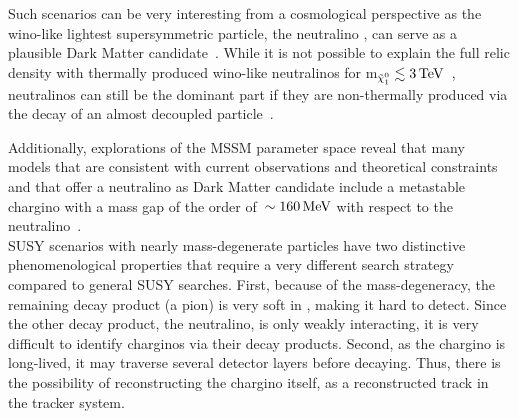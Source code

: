 Such scenarios can be very interesting from a cosmological perspective as the wino-like lightest supersymmetric particle, the neutralino \chiO, can serve as a plausible Dark Matter candidate~\cite{bib:Ibe:DarkMatter_2015,bib:Hisano:DarkMatter_2005}.
While it is not possible to explain the full relic density with thermally produced wino-like neutralinos for m$_{\tilde{\chi}^{0}_{1}}\lesssim 3\,\text{Te}\kern-0.06667em\text{V}$~\cite{bib:IndirectSearches_Cohen_2013}, neutralinos can still be the dominant part if they are non-thermally produced via the decay of an almost decoupled particle~\cite{bib:Moroi:DarkMatter_1999,bib:Moroi:DarkMatter_2013}.

Additionally, explorations of the MSSM parameter space reveal that many models that are consistent with current observations and theoretical constraints and that offer a neutralino as Dark Matter candidate include a metastable chargino with a mass gap of the order of~$\sim160\,\text{Me}\kern-0.06667em\text{V}$ with respect to the neutralino~\cite{bib:pMSSMScan_2013}.\\

SUSY scenarios with nearly mass-degenerate particles have two distinctive phenomenological properties that require a very different search strategy compared to general SUSY searches. 
First, because of the mass-degeneracy, the remaining decay product (\eg a pion) is very soft in \pt, making it hard to detect.
Since the other decay product, the neutralino, is only weakly interacting, it is very difficult to identify charginos via their decay products. 
Second, as the chargino is long-lived, it may traverse several detector layers before decaying.
Thus, there is the possibility of reconstructing the chargino itself, \eg as a reconstructed track in the tracker system.\\

